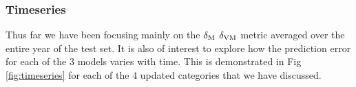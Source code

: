 \documentclass[hess, twostagejnl]{copernicus}
\providecommand{\DIFadd}[1]{{\protect\color{blue} \sf #1}} %
\providecommand{\DIFdel}[1]{{\protect\color{red} \scriptsize #1}} %
\providecommand{\DIFaddbegin}{} %
\providecommand{\DIFaddend}{} %
\providecommand{\DIFdelbegin}{} %
\providecommand{\DIFdelend}{} %
\begin{document}
	\DIFdelbegin %

\DIFdelend \subsubsection{Timeseries}
\DIFdelbegin %

\DIFdelend Thus far we have been focusing mainly on the \DIFdelbegin \DIFdel{$\delta_{\rm M}$ }\DIFdelend \DIFaddbegin \DIFadd{$\delta_{\rm VM}$ }\DIFaddend metric averaged over the entire year of the test set. It is also of interest to explore how the prediction error for each of the 3 models varies with time. This is demonstrated in Fig \ref{fig:timeseries} for each of the 4 updated categories that we have discussed. \newline 
\end{document}
